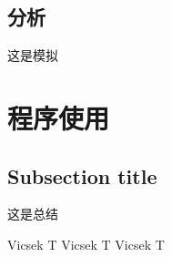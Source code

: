 \documentclass{article}
\begin{document}
\begin{CJK}
\subsection{分析}
	这是模拟
\section{程序使用}
\subsection{Subsection title}
        这是总结




\begin{thebibliography}{12345}%
 Vicsek T
 Vicsek T
 Vicsek T


\end{thebibliography}
\end{CJK}
\end{document}
